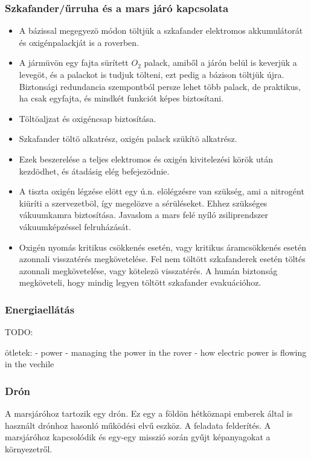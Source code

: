 \documentclass[12pt]{report}
\begin{document}
\subsubsection{Szkafander/űrruha és a mars járó kapcsolata}
\begin{itemize}

  \item {} A bázissal megegyezö módon töltjük a szkafander elektromos akkumulátorát és oxigénpalackját is a roverben.
  \item {} A jármüvön egy fajta sürített \(O_2\) palack, amiből a járón belül is keverjük a levegöt, és a palackot is tudjuk tölteni, ezt pedig a bázison töltjük újra. Biztonsági redundancia szempontból persze lehet több palack, de praktikus, ha csak egyfajta, és mindkét funkciót képes biztosítani.
  \item {} Töltöaljzat és oxigéncsap biztosítása.
  \item {} Szkafander töltö alkatrész, oxigén palack szükítö alkatrész.
  \item Ezek beszerelése a teljes elektromos és oxigén kivitelezési körök után kezdödhet, és átadásig elég befejezödnie.
  \item {} A tiszta oxigén légzése elött egy ú.n. elölégzésre van szükség, ami a nitrogént kiüríti a szervezetböl, így megelözve a sérüléseket. Ehhez szükséges vákuumkamra biztosítása. Javaslom a mars felé nyíló zsiliprendszer vákuumképzéssel felruházását.
  \item {} Oxigén nyomás kritikus csökkenés esetén, vagy kritikus áramcsökkenés esetén azonnali visszatérés megkövetelése. Fel nem töltött szkafanderek esetén töltés azonnali megkövetelése, vagy kötelezö visszatérés. A humán biztonság megköveteli, hogy mindig legyen töltött szkafander evakuációhoz.
\end{itemize}

\subsubsection{Energiaellátás} TODO:

ötletek:
- power
  - managing the power in the rover
  - how electric power is flowing in the vechile

\subsubsection{Drón}

A marsjáróhoz tartozik egy drón. Ez egy a földön hétköznapi emberek által is használt drónhoz hasonló működési elvű eszköz. A feladata felderítés. A marsjáróhoz kapcsolódik és egy-egy misszió során gyűjt képanyagokat a környezetről.
\end{document}
